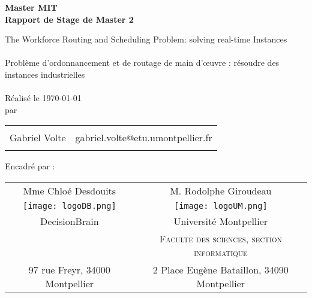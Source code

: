 \begin{titlepage}

\begin{center}

\textup {\bf Master MIT}  \\[0.2in]


\Huge  {\bf Rapport de Stage de Master 2}\\
    \vspace{0.3 cm}
   
       \vspace{1.0 cm}
       
      \huge{ The Workforce Routing and Scheduling Problem: solving real-time Instances}~\\~\\
      \huge{ Problème d'ordonnancement et de routage de main d’œuvre : résoudre des instances industrielles}~\\~\\
     
\normalsize Réalisé le \today \\ par \\
\begin{table}[h]
\centering
\begin{tabular}{lr}\hline \\
Gabriel Volte & gabriel.volte@etu.umontpellier.fr \\

\\
 \hline 
 

\end{tabular}
\end{table}


\vspace{4cm}


Encadré par :~\\
\vspace{1cm}
\end{center}
\begin{tabular}{cc}
\hspace{0.5cm} Mme Chloé Desdouits & \hspace{2.5cm} M. Rodolphe Giroudeau \\
\hspace{0.5cm}  \texttt{[image: logoDB.png]} & \hspace{2.5cm}
   \texttt{[image: logoUM.png]} \\
\hspace{0.5cm}   \Large{DecisionBrain } & \hspace{2.5cm} \Large{Université Montpellier }\\
\hspace{0.5cm}   \textsc{} & \hspace{2.5cm} \textsc{Faculte des sciences, section informatique} \\
\hspace{0.5cm} 97 rue Freyr, 34000 Montpellier & \hspace{2.5cm} 2 Place Eugène Bataillon, 34090 Montpellier \\
   

\end{tabular}
\end{titlepage}
